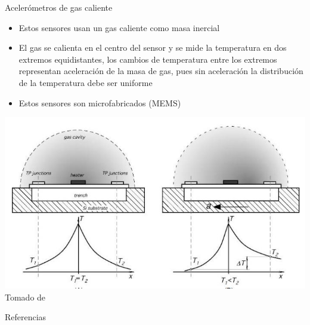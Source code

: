 \documentclass[aspectratio=169]{beamer}
\begin{document}
\begin{frame}{Acelerómetros de gas caliente}
            \begin{itemize}
                \item Estos sensores usan un gas caliente como masa inercial
                \item El gas se calienta en el centro del sensor y se mide la temperatura en dos extremos equidistantes, los cambios de temperatura entre los extremos representan aceleración de la masa de gas, pues sin aceleración la distribución de la temperatura debe ser uniforme
                \item Estos sensores son microfabricados (MEMS)
            \end{itemize}
            \centering
            \includegraphics[width = 0.5\linewidth]{fig/Fuerza_Vibracion/memsheatedgasacc.JPG}
            \tiny{Tomado de \cite{Fraden_2016}}
\end{frame}

\begin{frame}{Referencias}

\footnotesize

\end{frame}
\end{document}
